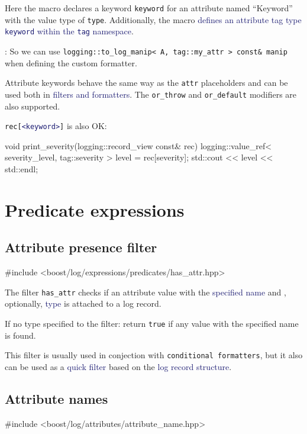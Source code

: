 \documentclass[dvipsnames]{article}
\newcommand{\mycola}{MidnightBlue}
\newcommand{\cola}[1]{\textcolor{\mycola}{#1}}
\begin{document}
Here the macro declares a keyword \texttt{keyword} for an attribute named
``Keyword'' with the value type of \texttt{type}. Additionally, the macro
\cola{defines an attribute tag type \texttt{keyword} within the \texttt{tag}
  namespace}.

\begin{tcolorbox}
   : So we can use \verb|logging::to_log_manip< A, tag::my_attr > const& manip|
  when defining the custom formatter.
\end{tcolorbox}

Attribute keywords behave the same way as the \texttt{attr} placeholders and can
be used both in \cola{filters and formatters}. The  \verb|or_throw| and
\verb|or_default| modifiers are also supported.

\texttt{rec[\cola{<keyword>}]} is also OK:
\begin{simplec}
  void print_severity(logging::record_view const& rec){
    logging::value_ref< severity_level, tag::severity > level = rec[severity];
    std::cout << level << std::endl;
}
\end{simplec}

\section{Predicate expressions}

\subsection{Attribute presence filter}
\begin{simplec}
  #include <boost/log/expressions/predicates/has_attr.hpp>
\end{simplec}
The filter \verb|has_attr| checks if an attribute value with the \cola{specified name}
and , optionally, \cola{type} is attached to a log record.

If no type specified to the filter: return \texttt{true} if any value with the
specified name is found.

This filter is usually used in conjection with \texttt{conditional formatters},
but it also can be used as a \cola{quick filter} based on the \cola{log record
  structure}. 

\subsection{Attribute names}
\begin{simplec}
  #include <boost/log/attributes/attribute_name.hpp>
\end{simplec}
\end{document}
